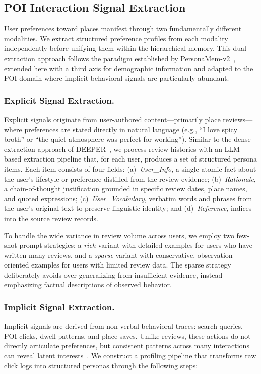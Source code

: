 \documentclass[manuscript,screen,review]{acmart}
\begin{document}
\subsection{POI Interaction Signal Extraction}

User preferences toward places manifest through two fundamentally different modalities. We extract structured preference profiles from each modality independently before unifying them within the hierarchical memory. This dual-extraction approach follows the paradigm established by PersonaMem-v2~\cite{personamem-v2}, extended here with a third axis for demographic information and adapted to the POI domain where implicit behavioral signals are particularly abundant.

\subsubsection{Explicit Signal Extraction.}
Explicit signals originate from user-authored content---primarily place reviews---where preferences are stated directly in natural language (e.g., ``I love spicy broth'' or ``the quiet atmosphere was perfect for working''). Similar to the dense extraction approach of DEEPER~\cite{deeper}, we process review histories with an LLM-based extraction pipeline that, for each user, produces a set of structured persona items. Each item consists of four fields: (a)~\textit{User\_Info}, a single atomic fact about the user's lifestyle or preference distilled from the review evidence; (b)~\textit{Rationale}, a chain-of-thought justification grounded in specific review dates, place names, and quoted expressions; (c)~\textit{User\_Vocabulary}, verbatim words and phrases from the user's original text to preserve linguistic identity; and (d)~\textit{Reference}, indices into the source review records.

To handle the wide variance in review volume across users, we employ two few-shot prompt strategies: a \textit{rich} variant with detailed examples for users who have written many reviews, and a \textit{sparse} variant with conservative, observation-oriented examples for users with limited review data. The sparse strategy deliberately avoids over-generalizing from insufficient evidence, instead emphasizing factual descriptions of observed behavior.

\subsubsection{Implicit Signal Extraction.}
Implicit signals are derived from non-verbal behavioral traces: search queries, POI clicks, dwell patterns, and place saves. Unlike reviews, these actions do not directly articulate preferences, but consistent patterns across many interactions can reveal latent interests~\cite{proex}. We construct a profiling pipeline that transforms raw click logs into structured personas through the following steps:
\end{document}
